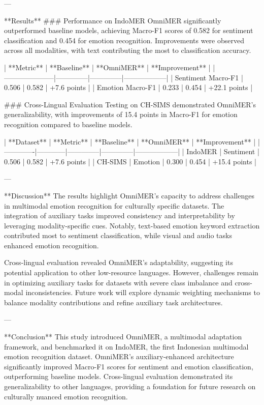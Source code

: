 ---

**Results**  
### Performance on IndoMER  
OmniMER significantly outperformed baseline models, achieving Macro-F1 scores of 0.582 for sentiment classification and 0.454 for emotion recognition. Improvements were observed across all modalities, with text contributing the most to classification accuracy.  

| **Metric**         | **Baseline** | **OmniMER** | **Improvement** |  
|---------------------|--------------|--------------|------------------|  
| Sentiment Macro-F1  | 0.506        | 0.582        | +7.6 points      |  
| Emotion Macro-F1    | 0.233        | 0.454        | +22.1 points     |  

### Cross-Lingual Evaluation  
Testing on CH-SIMS demonstrated OmniMER’s generalizability, with improvements of 15.4 points in Macro-F1 for emotion recognition compared to baseline models.  

| **Dataset** | **Metric** | **Baseline** | **OmniMER** | **Improvement** |  
|-------------|------------|--------------|--------------|------------------|  
| IndoMER     | Sentiment  | 0.506        | 0.582        | +7.6 points      |  
| CH-SIMS     | Emotion    | 0.300        | 0.454        | +15.4 points     |  

---

**Discussion**  
The results highlight OmniMER’s capacity to address challenges in multimodal emotion recognition for culturally specific datasets. The integration of auxiliary tasks improved consistency and interpretability by leveraging modality-specific cues. Notably, text-based emotion keyword extraction contributed most to sentiment classification, while visual and audio tasks enhanced emotion recognition.  

Cross-lingual evaluation revealed OmniMER’s adaptability, suggesting its potential application to other low-resource languages. However, challenges remain in optimizing auxiliary tasks for datasets with severe class imbalance and cross-modal inconsistencies. Future work will explore dynamic weighting mechanisms to balance modality contributions and refine auxiliary task architectures.  

---

**Conclusion**  
This study introduced OmniMER, a multimodal adaptation framework, and benchmarked it on IndoMER, the first Indonesian multimodal emotion recognition dataset. OmniMER’s auxiliary-enhanced architecture significantly improved Macro-F1 scores for sentiment and emotion classification, outperforming baseline models. Cross-lingual evaluation demonstrated its generalizability to other languages, providing a foundation for future research on culturally nuanced emotion recognition.  

